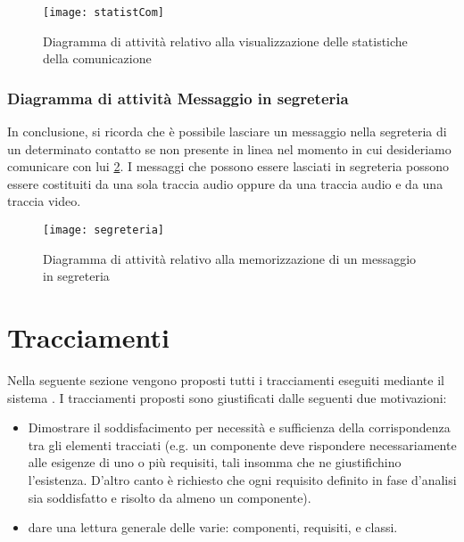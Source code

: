 \begin{figure}[H]
  \centering
  \texttt{[image: statistCom]}
  \caption{Diagramma di attività relativo alla visualizzazione delle statistiche della comunicazione}\label{fig:ADstatistiche}
\end{figure}

\subsubsection{Diagramma di attività Messaggio in segreteria}
In conclusione, si ricorda che è possibile lasciare un messaggio nella segreteria di un determinato contatto se non presente in linea nel momento in cui desideriamo comunicare con lui \ref{fig:ADmessegreteria}. I messaggi che possono essere lasciati in segreteria possono essere costituiti da una sola traccia audio oppure da una traccia audio e da una traccia video.

\begin{figure}[H]
  \centering
  \texttt{[image: segreteria]}
  \caption{Diagramma di attività relativo alla memorizzazione di un messaggio in segreteria}\label{fig:ADmessegreteria}
\end{figure}
\clearpage

\section{Tracciamenti}\label{sec:tracciamenti}
Nella seguente sezione vengono proposti tutti i tracciamenti eseguiti mediante il sistema \manager. I tracciamenti proposti sono giustificati dalle seguenti due motivazioni:

\begin{itemize}
	\item Dimostrare il soddisfacimento per necessità e sufficienza della corrispondenza tra gli elementi tracciati (e.g. un componente deve rispondere necessariamente alle esigenze di uno o più requisiti, tali insomma che ne giustifichino l'esistenza. D'altro canto è richiesto che ogni requisito definito in fase d'analisi sia soddisfatto e risolto da almeno un componente).
	\item dare una lettura generale delle varie: componenti, requisiti,  e classi.
\end{itemize}




